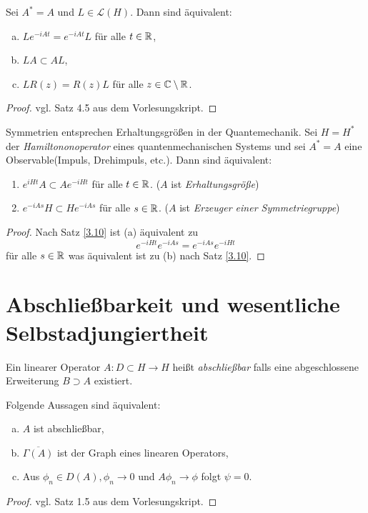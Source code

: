 \documentclass{mycourse}
\begin{document}
\begin{st}\label{3.11}
Sei $A^*=A$ und $L\in \mathcal L(H)$. Dann sind äquivalent:
\begin{enumerate}[a)]
\item $Le^{-iAt} = e^{-iAt} L$ für alle $t\in \mathbb{R}$,
\item $LA \subset AL$,
\item $LR(z) = R(z) L$ für alle $z\in \mathbb{C}\setminus \mathbb{R}$.
\end{enumerate}
\end{st}
\begin{proof}
vgl. Satz 4.5 aus dem Vorlesungskript.
\end{proof}
\begin{seg}[Anwendungen]
Symmetrien entsprechen Erhaltungsgrößen in der Quantemechanik. Sei $H=H^*$ der \emph{Hamiltononoperator} eines quantenmechanischen Systems und sei $A^*=A$ eine Observable(Impuls, Drehimpuls, etc.). Dann sind äquivalent:
\begin{enumerate}
\item $e^{iHt}A\subset A e^{-iHt}$ für alle $t\in \mathbb{R}$. ($A$ ist \emph{Erhaltungsgröße})
\item $e^{-iAs} H \subset H e^{-iAs}$ für alle $s\in \mathbb{R}$. ($A$ ist \emph{Erzeuger einer Symmetriegruppe})
\end{enumerate}
\begin{proof}
Nach Satz \ref{3.10}  ist (a) äquivalent zu 
\[
e^{-iHt} e^{-iAs} = e^{-iAs} e^{-iHt}
\]
für alle $s\in \mathbb{R}$ was äquivalent ist zu (b) nach Satz \ref{3.10}.
\end{proof}
\end{seg}

\section{Abschließbarkeit und wesentliche Selbstadjungiertheit}

Ein linearer Operator $A:D\subset H\to H$ heißt \emph{abschließbar} falls eine abgeschlossene Erweiterung $B\supset A$ existiert.

\begin{st}\label{3.11}
Folgende Aussagen sind äquivalent:
\begin{enumerate}[a)]
\item $A$ ist abschließbar,
\item $\overline{\Gamma(A)}$ ist der Graph eines linearen Operators,
\item Aus $\phi_n\in D(A), \phi_n \to 0$ und $A\phi_n \to \phi$ folgt $\psi=0$.
\end{enumerate}
\end{st}
\begin{proof}
vgl. Satz 1.5 aus dem Vorlesungskript.
\end{proof}
\end{document}
